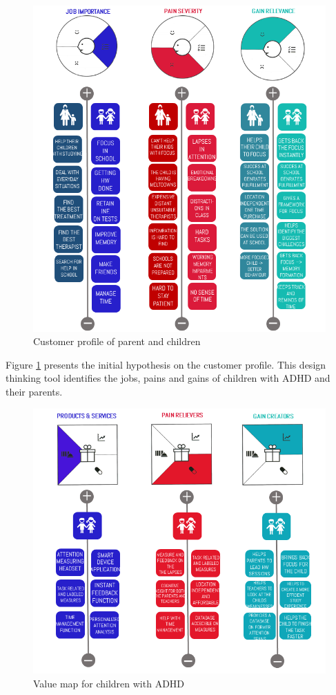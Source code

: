 \documentclass[letterpaper,10pt]{article}
\begin{document}
\begin{figure}[!htb]
\centering
\includegraphics[scale=0.5]{customer_profile.PNG}
\caption{Customer profile of parent and children}
\label{img:customer_profile}
\end{figure}

Figure \ref{img:customer_profile} presents the initial hypothesis on the customer profile. This design thinking tool identifies the jobs, pains and gains of children with ADHD and their parents.  

\begin{figure}[!htb]
\centering
\includegraphics[scale=0.5]{value_map.PNG}
\caption{Value map for children with ADHD}
\label{img:value_map}
\end{figure}
\end{document}
